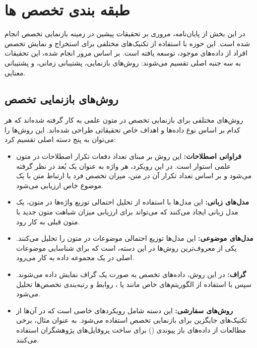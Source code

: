 \section*{طبقه بندی تخصص ها}

در این بخش از پایان‌نامه، مروری بر تحقیقات پیشین در زمینه بازنمایی تخصص انجام شده است. این حوزه با استفاده از تکنیک‌های مختلفی برای استخراج و نمایش تخصص افراد از داده‌های موجود، توسعه یافته است. بر اساس مرور انجام شده، این تحقیقات به سه جنبه اصلی تقسیم می‌شوند: روش‌های بازنمایی، پشتیبانی زمانی، و پشتیبانی معنایی.
\cite{intern}
\cite{tshape}
\subsection*{روش‌های بازنمایی تخصص} روش‌های مختلفی برای بازنمایی تخصص در متون علمی به کار گرفته شده‌اند که هر کدام بر اساس نوع داده‌ها و اهداف خاص تحقیقاتی طراحی شده‌اند. این روش‌ها را می‌توان به پنج دسته اصلی تقسیم کرد: \begin{itemize} \item \textbf{فراوانی اصطلاحات:} این روش بر مبنای تعداد دفعات تکرار اصطلاحات در متون علمی استوار است. در این رویکرد، هر واژه به عنوان یک بُعد در نظر گرفته می‌شود و بر اساس تعداد تکرار آن در متن، میزان تخصص فرد یا ارتباط متن با یک موضوع خاص ارزیابی می‌شود. \item \textbf{مدل‌های زبانی:} این مدل‌ها با استفاده از تحلیل احتمالی توزیع واژه‌ها در متون، یک مدل زبانی ایجاد می‌کنند که می‌تواند برای ارزیابی میزان شباهت متون جدید با متون قبلی به کار رود. \item \textbf{مدل‌های موضوعی:} این مدل‌ها توزیع احتمالی موضوعات در متون را تحلیل می‌کنند. یکی از معروف‌ترین روش‌ها در این دسته،  است که برای شناسایی موضوعات اصلی در یک مجموعه داده به کار می‌رود. \item \textbf{گراف:} در این روش، داده‌های تخصص به صورت یک گراف نمایش داده می‌شوند. سپس با استفاده از الگوریتم‌های خاص مانند  یا ، روابط و رتبه‌بندی تخصص‌ها تحلیل می‌شود. \item \textbf{روش‌های سفارشی:} این دسته شامل رویکردهای خاصی است که در آن‌ها از تکنیک‌های جایگزین برای بازنمایی تخصص استفاده می‌شود. به عنوان مثال، برخی مطالعات از داده‌های باز پیوندی () برای ساخت پروفایل‌های پژوهشگران استفاده می‌کنند. \end{itemize}

